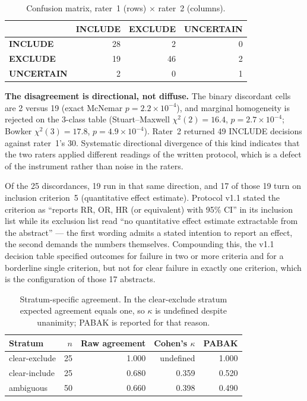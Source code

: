 \documentclass[11pt]{article}
\newenvironment{fittab}{\begin{lrbox}{\fittabbox}}{\end{lrbox}%
  \ifdim\wd\fittabbox>\linewidth\resizebox{\linewidth}{!}{\usebox{\fittabbox}}\else\usebox{\fittabbox}\fi}
\begin{document}
\begin{table}[htbp]
\centering
\caption{Confusion matrix, rater~1 (rows) $\times$ rater~2 (columns).}
\label{tab:humanconfusion}
\small
\begin{fittab}\begin{tabular}{lrrr}
\toprule
 & \textbf{INCLUDE} & \textbf{EXCLUDE} & \textbf{UNCERTAIN} \\
\midrule
\textbf{INCLUDE}   & 28 & 2  & 0 \\
\textbf{EXCLUDE}   & 19 & 46 & 2 \\
\textbf{UNCERTAIN} & 2  & 0  & 1 \\
\bottomrule
\end{tabular}\end{fittab}
\end{table}

\textbf{The disagreement is directional, not diffuse.} The binary discordant cells are 2 versus 19 (exact McNemar $p=2.2\times10^{-4}$), and marginal homogeneity is rejected on the 3-class table (Stuart--Maxwell $\chi^2(2)=16.4$, $p=2.7\times10^{-4}$; Bowker $\chi^2(3)=17.8$, $p=4.9\times10^{-4}$). Rater~2 returned 49 INCLUDE decisions against rater~1's 30. Systematic directional divergence of this kind indicates that the two raters applied different readings of the written protocol, which is a defect of the instrument rather than noise in the raters.

Of the 25 discordances, 19 run in that same direction, and 17 of those 19 turn on inclusion criterion~5 (quantitative effect estimate). Protocol v1.1 stated the criterion as ``reports RR, OR, HR (or equivalent) with 95\% CI'' in its inclusion list while its exclusion list read ``no quantitative effect estimate extractable from the abstract'' --- the first wording admits a stated intention to report an effect, the second demands the numbers themselves. Compounding this, the v1.1 decision table specified outcomes for failure in two or more criteria and for a borderline single criterion, but not for clear failure in exactly one criterion, which is the configuration of those 17 abstracts.

\begin{table}[htbp]
\centering
\caption{Stratum-specific agreement. In the clear-exclude stratum expected agreement equals one, so $\kappa$ is undefined despite unanimity; PABAK is reported for that reason.}
\label{tab:strata}
\small
\begin{fittab}\begin{tabular}{lrrrr}
\toprule
\textbf{Stratum} & \textbf{$n$} & \textbf{Raw agreement} & \textbf{Cohen's $\kappa$} & \textbf{PABAK} \\
\midrule
clear-exclude & 25 & 1.000 & undefined & 1.000 \\
clear-include & 25 & 0.680 & 0.359 & 0.520 \\
ambiguous     & 50 & 0.660 & 0.398 & 0.490 \\
\bottomrule
\end{tabular}\end{fittab}
\end{table}
\end{document}

